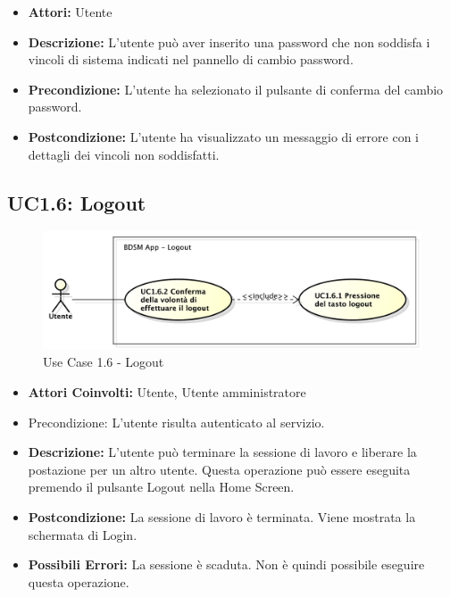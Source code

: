 \begin{itemize}
    \item \textbf{Attori:} Utente
    \item \textbf{Descrizione:} L'utente può aver inserito una password che non soddisfa i vincoli di sistema indicati nel pannello di cambio password.
    \item \textbf{Precondizione:} L'utente ha selezionato il pulsante di conferma del cambio password.
    \item \textbf{Postcondizione:} L'utente ha visualizzato un messaggio di errore con i dettagli dei vincoli non soddisfatti.
\end{itemize}

\clearpage


\subsection{UC1.6: Logout}

\begin{figure}[htbp]
    \centering
    \centerline{\includegraphics[scale=0.5]{./images/UC1_6.pdf}}
    \caption{Use Case 1.6 - Logout}
\end{figure}

\begin{itemize}
    \item \textbf{Attori Coinvolti:} Utente, Utente amministratore
    \item {Precondizione:} L'utente risulta autenticato al servizio.
    \item \textbf{Descrizione:} L'utente può terminare la sessione di lavoro e liberare la postazione per un altro utente. Questa operazione può essere eseguita premendo il pulsante Logout nella Home Screen.
    \item \textbf{Postcondizione:} La sessione di lavoro è terminata. Viene mostrata la schermata di Login.
    \item \textbf{Possibili Errori:} La sessione è scaduta. Non è quindi possibile eseguire questa operazione.
\end{itemize}

